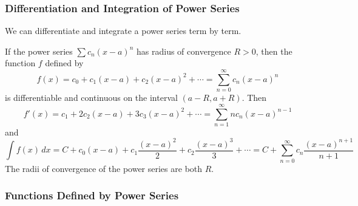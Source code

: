 \subsubsection*{Differentiation and Integration of Power Series}
We can differentiate and integrate a power series term by term.
\begin{theorem}
    If the power series \(\sum c_n(x-a)^n\) has radius of convergence \(R>0\),
    then the function \(f\) defined by
    \[f(x)=c_0+c_1(x-a)+c_2(x-a)^2+\cdots=\sum_{n=0}^\infty c_n(x-a)^n\]
    is differentiable and continuous on the interval \((a-R,a+R)\).
    Then
    \[f'(x)=c_1+2c_2(x-a)+3c_3(x-a)^2+\cdots
    =\sum_{n=1}^\infty nc_n(x-a)^{n-1}\]
    and
    \[\int f(x)\,dx
    =C+c_0(x-a)+c_1\frac{(x-a)^2}{2}+c_2\frac{(x-a)^3}{3}+\cdots
    =C+\sum_{n=0}^\infty c_n\frac{(x-a)^{n+1}}{n+1}\]
    The radii of convergence of the power series are both \(R\).
\end{theorem}

\subsubsection*{Functions Defined by Power Series}